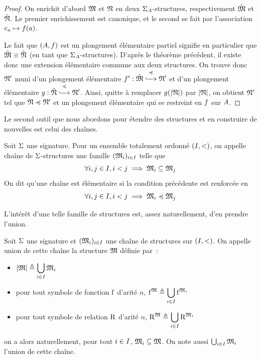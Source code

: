 \begin{proof}
  On enrichit d'abord $\mathfrak{M}$ et $\mathfrak{N}$ en deux $\Sigma_{A}$-structures,
  respectivement $\hat{\mathfrak{M}}$ et $\hat{\mathfrak{N}}$. Le premier enrichissement
  est canonique, et le second se fait par l'association
  $\mathrm{c}_{a} \mapsto f(a)$.

  Le fait que $(A,f)$ est un plongement élémentaire partiel
  signifie en particulier que $\hat{\mathfrak{M}}\equiv\hat{\mathfrak{N}}$ (en tant
  que $\Sigma_{A}$-structures). D'après le théorème précédent, il existe
  donc une extension élémentaire commune aux deux structures.
  On trouve donc $\mathfrak{N}'$ muni d'un plongement élémentaire
  $f' : \displaystyle \hat{\mathfrak{M}} \overset{\preccurlyeq}{\xhookrightarrow{\quad}} \mathfrak{N}'$ et d'un plongement
  élémentaire $g : \displaystyle \hat{\mathfrak{N}} \overset{\preccurlyeq}{\xhookrightarrow{\quad}} \mathfrak{N}'$. Ainsi,
  quitte à remplacer $g(\left\vert \mathfrak{N}\right\vert)$ par $\left\vert \mathfrak{N}\right\vert$, on obtient $\mathfrak{N}'$ tel
  que $\mathfrak{N}\preccurlyeq\mathfrak{N}'$ et un plongement élémentaire qui se restreint
  en $f$ sur $A$.
\end{proof}

Le second outil que nous abordons pour étendre des structures et en construire
de nouvelles est celui des chaînes.

\begin{definition}
  Soit $\Sigma$ une signature. Pour un ensemble totalement ordonné $(I,<)$,
  on appelle chaîne de $\Sigma$-structures une famille $(\mathfrak{M}_i)_{i \in I}$
  telle que
  \[\forall i,j \in I, i < j \implies \mathfrak{M}_i \subseteq\mathfrak{M}_j\]
  On dit qu'une chaîne est élémentaire si la condition précédente est renforcée
  en
  \[\forall i,j \in I, i < j \implies \mathfrak{M}_i\preccurlyeq\mathfrak{M}_j\]
\end{definition}

L'intérêt d'une telle famille de structures est, assez naturellement, d'en
prendre l'union.

\begin{definition}
  Soit $\Sigma$ une signature et $(\mathfrak{M}_i)_{i \in I}$ une chaîne
  de structures sur $(I,<)$. On appelle union de cette chaîne la
  structure $\mathfrak{M}$ définie par~:
  \begin{itemize}
  \item $\displaystyle\left\vert \mathfrak{M}\right\vert \triangleq \bigcup_{i \in I}\mathfrak{M}_i$
  \item pour tout symbole de fonction $\mathrm{f}$ d'arité $n$,
    $\displaystyle\mathrm{f}^{\mathfrak{M}}\triangleq
    \bigcup_{i \in I}\mathrm{f}^{\mathfrak{M}_i}$
  \item pour tout symbole de relation $\mathrm{R}$ d'arité $n$,
    $\displaystyle\mathrm{R}^{\mathfrak{M}}\triangleq
    \bigcup_{i \in I}\mathrm{R}^{\mathfrak{M}_i}$
  \end{itemize}
  on a alors naturellement, pour tout $i \in I$,
  $\mathfrak{M}_i\subseteq\mathfrak{M}$. On note aussi $\bigcup_{i \in I}\mathfrak{M}_i$
  l'union de cette chaîne.
\end{definition}

